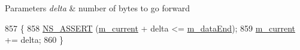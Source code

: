 \begin{DoxyParams}{Parameters}
{\em delta} & number of bytes to go forward \\
\hline
\end{DoxyParams}

\begin{DoxyCode}
857 \{
858   \hyperlink{assert_8h_a6dccdb0de9b252f60088ce281c49d052}{NS\_ASSERT} (\hyperlink{classns3_1_1Buffer_1_1Iterator_a762e0242d60f4d717158d0584e4accd6}{m\_current} + delta <= \hyperlink{classns3_1_1Buffer_1_1Iterator_a0c6c677b1bbb7ee98a99dd7f40b495b8}{m\_dataEnd});
859   \hyperlink{classns3_1_1Buffer_1_1Iterator_a762e0242d60f4d717158d0584e4accd6}{m\_current} += delta;
860 \}
\end{DoxyCode}
